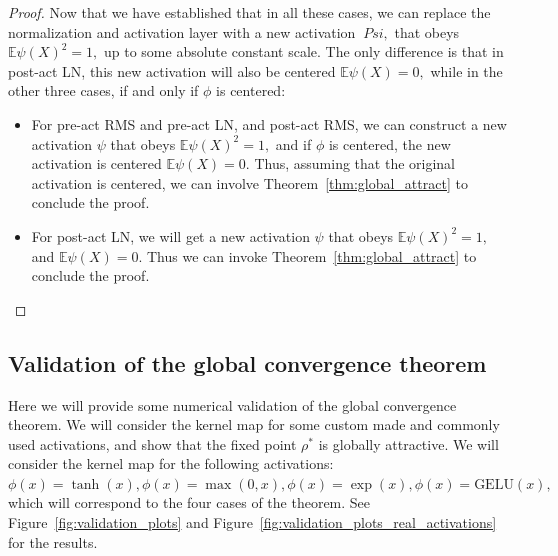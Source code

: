 \documentclass[twoside]{article}
\newcommand{\E}{\mathbb{E}}
\theoremstyle{definition}
\begin{document}
\begin{proof}
Now that we have established that in all these cases, we can replace the normalization and activation layer with a new activation $\ Psi,$ that obeys $\E \psi(X)^2 = 1,$ up to some absolute constant scale. The only difference is that in post-act LN, this new activation will also be centered $\E \psi(X) = 0,$ while in the other three cases, if and only if $\phi$ is centered:

\begin{itemize}
    \item For pre-act RMS and pre-act LN, and post-act RMS, we can construct a new activation $\psi$ that obeys $\E \psi(X)^2 = 1,$ and if $\phi$ is centered, the new activation is centered $\E \psi(X) = 0.$ Thus, assuming that the original activation is centered, we can involve Theorem~\ref{thm:global_attract} to conclude the proof.
    \item For post-act LN, we will get a new activation $\psi$ that obeys $\E \psi(X)^2 = 1,$ and $\E \psi(X) = 0.$ Thus we can invoke Theorem~\ref{thm:global_attract} to conclude the proof.
\end{itemize}
\end{proof}


\subsection*{Validation of the global convergence theorem}
Here we will provide some numerical validation of the global convergence theorem. We will consider the kernel map for some custom made and commonly used activations, and show that the fixed point $\rho^*$ is globally attractive. We will consider the kernel map for the following activations: $\phi(x) = \tanh(x), \phi(x) = \max(0,x), \phi(x) = \exp(x), \phi(x) = \text{GELU}(x),$ which will correspond to the four cases of the theorem. See Figure~\ref{fig:validation_plots} and Figure~\ref{fig:validation_plots_real_activations} for the results.
\end{document}
